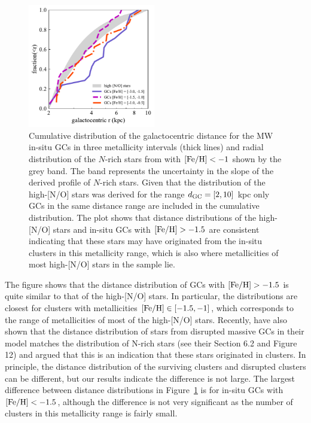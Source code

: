 \documentclass[a4paper,useAMS,usenatbib]{mnras}
\begin{document}
%
\begin{figure}
  \centering
  \includegraphics[width=0.495\textwidth]{img/dgc_nrich_dist.pdf}
  \caption[]{Cumulative distribution of the galactocentric distance for the MW in-situ GCs in three metallicity intervals (thick lines) and radial distribution of the $N$-rich stars from \citet{Horta2021} with $\rm [Fe/H]<-1$ shown by the grey band. The band represents the uncertainty in the slope of the derived profile of $N$-rich stars. Given that the distribution of the high-[N/O] stars was derived for the range $d_{\rm GC}=[2,10]$ kpc only GCs in the same distance range are included in the cumulative distribution. The plot shows that distance distributions of the high-[N/O] stars and in-situ GCs with $\rm [Fe/H]>-1.5$ are consistent indicating that these stars may have originated from the in-situ clusters in this metallicity range, which is also where metallicities of most high-[N/O] stars in the \citet{Horta2021} sample lie.  } 
   \label{fig:dgc_nrich_dist}
\end{figure}

The figure shows that the distance distribution of GCs with $\rm [Fe/H]>-1.5$ is quite similar to that of the high-[N/O] stars. In particular, the distributions are closest for clusters with metallicities $\rm [Fe/H]\in[-1.5,-1]$, which corresponds to the range of metallicities of most of the high-[N/O] stars. Recently, \citet{Gieles2023} have also shown that the distance distribution of stars from disrupted massive GCs in their model matches the distribution of N-rich stars (see their Section 6.2 and Figure 12) and argued that this is an indication that these stars originated in clusters. In principle, the distance distribution of the surviving clusters and disrupted clusters can be different, but our results indicate the difference is not large. 
The largest difference between distance distributions in Figure~\ref{fig:dgc_nrich_dist} is for in-situ GCs with $\rm [Fe/H]<-1.5$, although the difference is not very significant as the number of clusters in this metallicity range is fairly small. 
\end{document}
